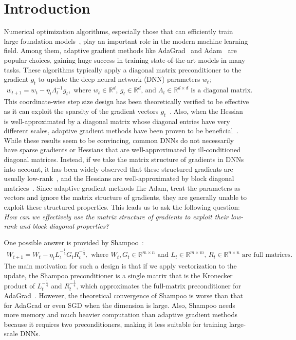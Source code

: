 \documentclass{article}
\theoremstyle{remark}
\newcommand{\RR}{\mathbb{R}}
\begin{document}
\section{Introduction}
Numerical optimization algorithms, especially those that can efficiently train large foundation models~\citep{devlin2018bert, brown2020gpt3, touvron2023llama, touvron2023llama2, ouyang2022instructgpt}, 
play an important role in the modern machine learning field. Among them, adaptive gradient methods like AdaGrad~\citep{duchi2011adaptive} and Adam~\citep{kingma2014adam} are popular choices, gaining huge success in training state-of-the-art models in many tasks. These algorithms typically apply a diagonal matrix preconditioner to the gradient $g_t$ to update the deep neural network (DNN) parameters $w_t$;
\begin{align*}
    w_{t+1} = w_t - \eta_t \Lambda_t^{-1} g_t, \text{ where $w_t\in\RR^d$, $g_t\in\RR^d$, and $\Lambda_t \in \RR^{d\times d}$ is a diagonal matrix}.
\end{align*}
This coordinate-wise step size design has been theoretically verified to be effective as it can exploit the sparsity of the gradient vectors $g_t$~\citep{duchi2011adaptive}. Also, when the Hessian {is well-approximated by a diagonal matrix whose diagonal entries have very different scales}, adaptive gradient methods have been proven to be beneficial~\citep{liu2024adagrad,jiang2024convergence,xie2024adam}. While these results seem to be convincing, common DNNs do not necessarily have sparse gradients or Hessians that are well-approximated by ill-conditioned diagonal matrices. Instead, if we take the matrix structure of gradients in DNNs
into account, it has been widely observed that {these structured} gradients are usually low-rank~\citep{zhao2021zero,yang2023spectral,cosson2023low}, and the Hessians {are well-approximated by} block diagonal matrices~\citep{collobert2004large,zhang2024transformers,zhang2024adam}. Since adaptive gradient methods like Adam, treat the parameters as vectors and ignore the matrix structure of gradients, they are generally unable to exploit these structured properties. This leads us to ask the following question: \textit{How can we 
effectively use the matrix structure of gradients 
to exploit their low-rank and block diagonal properties?}

One possible answer is provided by Shampoo~\citep{gupta2018shampoo}:
\begin{align*}
    W_{t+1} = W_t - \eta_t L_t^{-\frac{1}{4}} G_t R_t^{-\frac{1}{4}}, \text{ where $W_t, G_t\in \RR^{m\times n}$ and $L_t \in \RR^{m\times m}$, $R_t \in \RR^{n\times n}$ are full matrices.}
\end{align*}
The main motivation for such a design is that if we apply vectorization to the update, the Shampoo preconditioner is a single matrix that is the Kronecker product of $L_t^{-\frac{1}{4}}$ and $R_t^{-\frac{1}{4}}$, which approximates the full-matrix preconditioner for AdaGrad~\citep{duchi2011adaptive}. However, the {theoretical convergence of Shampoo is worse than that for} AdaGrad or even SGD when the dimension is large. Also, Shampoo needs more memory and much heavier computation than adaptive gradient methods because it requires two preconditioners, making it less suitable for training large-scale DNNs.
\end{document}
